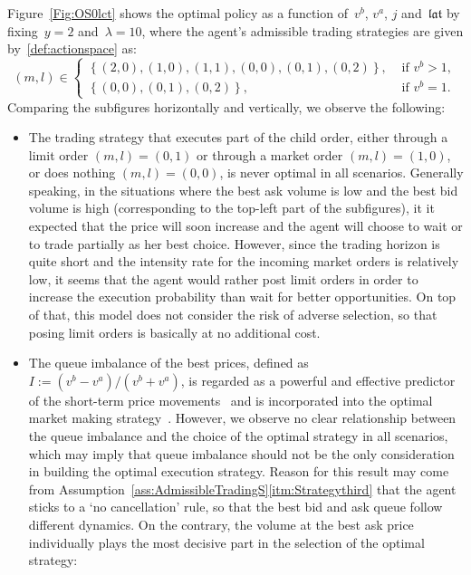 \documentclass{amsart}[11pt]
\numberwithin{equation}{section}
\theoremstyle{definition}
\begin{document}
Figure~\ref{Fig:OS0lct} shows the optimal policy as a function of~$v^b$, $v^a$, $j$ and~$\mathfrak{lat}$ by fixing~$y=2$ and~$\lambda = 10$,
where the agent's admissible trading strategies are given by~\eqref{def:actionspace} as:
\begin{equation*}
(m, l)
\in
 \left\{
 \begin{array}{ll}
\left\{(2, 0), (1, 0), (1, 1), (0 ,0), (0, 1), (0, 2)\right\}, & \text{ if }v^b > 1,\\
\left\{(0, 0), (0, 1), (0, 2)\right\}, & \text{ if }v^b = 1.
 \end{array}
\right.
\end{equation*}
Comparing the subfigures horizontally and vertically, we observe the following:
\begin{itemize}
\item 
The trading strategy that executes part of the child order, either through a limit order
$(m, l) = (0, 1)$ or through a market order $(m, l) = (1, 0)$, or does nothing $(m, l) = (0, 0)$, 
is never optimal in all scenarios. 
Generally speaking, in the situations where the best ask volume is low and the best bid volume is high
(corresponding to the top-left part of the subfigures), it it expected that the price will soon increase and the agent will choose to wait or to trade partially as her best choice.
However, since the trading horizon is quite short and the intensity rate for the incoming market orders is relatively low,
it seems that the agent would rather post limit orders in order to increase the execution probability 
than wait for better opportunities.
On top of that, this model does not consider the risk of adverse selection, 
so that posing limit orders is basically at no additional cost.
\item 
The queue imbalance of the best prices, defined as~$I := (v^b - v^a)/(v^b + v^a)$, is regarded as a powerful and effective predictor of the short-term price movements~\cite{gould2015queue, yang2016reduced} and is incorporated into the optimal market making strategy~\cite{cartea2015enhancing}.
However, we observe no clear relationship between the queue imbalance and the choice of the optimal strategy in all scenarios,
which may imply that queue imbalance should not be the only consideration in building the optimal execution strategy.
Reason for this result may come from Assumption~\ref{ass:AdmissibleTradingS}\eqref{itm:Strategythird} that the agent sticks to a `no cancellation' rule, so that the best bid and ask queue follow different dynamics.
On the contrary, the volume at the best ask price individually plays the most decisive part in the selection of the optimal strategy: 

\end{itemize}
\end{document}
